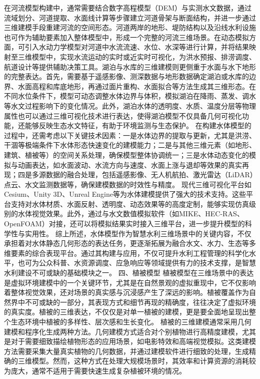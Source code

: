 {{在河流模型构建中，通常需要结合数字高程模型（DEM）与实测水文数据，通过流域划分、河道提取、水面线计算等步骤建立河道骨架与断面结构，并进一步通过三维建模手段重建河流的空间形态。河道两岸的地形、堤防结构以及沿线水利设施也可作为辅助要素加入整体模型中，形成一个完整的河流三维场景。在动态模拟方面，可引入水动力学模型对河道中水流流速、水位、水深等进行计算，并将结果映射至三维模型中，实现水流运动的实时或近实时可视化，为洪水预报、排涝调度、航道设计等提供辅助决策工具。湖泊与水库的三维建模则更侧重于水面与水下地形的完整表达。首先，需要基于遥感影像、测深数据与地形数据确定湖泊或水库的边界、水面高程和库底地形，再通过面片重构、水面拟合等方法生成其三维形态。在不同水位条件下，模型可动态调整水体边界与体积，模拟湖泊在降雨、蒸发、调水等水文过程影响下的变化情况。此外，湖泊水体的透明度、水质、温度分层等物理属性也可以通过三维可视化技术进行表达，使得湖泊模型不仅具备几何可视化功能，还能够反映生态水文特征，有助于环境监测与生态保护。 在构建水体模型的过程中，还需考虑以下关键技术因素：一是水体边界的提取与更新，尤其是洪涝、干涸等极端条件下水体形态快速变化的建模能力；二是与其他三维元素（如地形、建筑、植被等）的空间关系处理，确保模型整体协调统一；三是水体动态变化的模拟与动画表达，如水面波动、水流方向与速度、水面上涨与退却等效果的真实再现；四是多源数据的融合处理，包括遥感影像、无人机航拍、激光雷达（LiDAR）点云、水文监测数据等，确保建模数据的时效性与精度。 现代三维可视化平台如Cesium、Unity 3D、Unreal Engine等为水体建模提供了强大的技术支持。这些平台支持对水体材质、水面反射、透明度、动态效果等的高度定制，能够实现仿真级别的水体视觉效果。此外，通过与水文数值模拟软件（如MIKE、HEC-RAS、OpenFOAM）对接，还可以将模拟结果实时接入三维平台，进一步提升模型的科学性与实用性。 综上所述，水体模型作为智慧水利三维场景中的关键内容，不仅承担着对水体静态几何形态的表达任务，更逐渐拓展为融合水文、水力、生态等多维要素的综合表现平台。通过其构建与应用，不仅可提升水利工程管理的科学化水平，也可为公众科普、水资源调度、应急响应等领域提供有力的技术支撑，是智慧水利建设不可或缺的基础模块之一。 四、植被模型 植被模型在三维场景中的表达是虚拟环境建模中的一个关键环节，尤其是在自然景观的虚拟重现中，它不仅影响着整体视觉效果，还对场景的真实感与沉浸感产生了深远的影响。植被覆盖作为自然界中不可或缺的一部分，其表现方式和细节再现的精确度，往往决定了虚拟环境的真实度。植被的三维表达，不仅仅是对单一植被的建模，更是要全面地呈现出整个生态环境中植被的多样性、层次感和生长变化。 植被的三维建模通常采用几何建模和程序化生成两种方法。几何建模方式适合对个别植物进行高精度建模，尤其是对于需要细致描绘植物形态的应用场景，如电影特效和高端视觉模拟。这类建模方法需要采集大量真实植物的几何数据，并通过建模软件进行细致的处理，生成精确的三维模型。然而，这种方式在处理大规模场景时，其效率和计算资源的消耗较为庞大，通常不适用于需要快速生成复杂植被环境的情况。 }}
